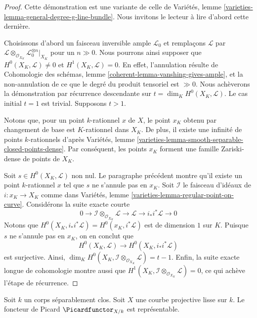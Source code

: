 \begin{proof}
Cette démonstration est une variante de celle de
Variétés, lemme \ref{varieties-lemma-general-degree-g-line-bundle}.
Nous invitons le lecteur à lire d'abord cette dernière.

\medskip\noindent
Choisissons d'abord un faisceau inversible ample $\mathcal{L}_0$ et
remplaçons $\mathcal{L}$ par
$\mathcal{L} \otimes_{\mathcal{O}_{X_K}} \mathcal{L}_0^{\otimes n}|_{X_K}$
pour un $n \gg 0$. Nous pourrons ainsi supposer que
$H^0(X_K, \mathcal{L}) \not = 0$ et $H^1(X_K, \mathcal{L}) = 0$.
En effet, l'annulation résulte de Cohomologie des schémas, lemme
\ref{coherent-lemma-vanshing-gives-ample}, et la non-annulation de ce que
le degré du produit tensoriel est $\gg 0$.
Nous achèverons la démonstration par récurrence descendante sur
$t = \dim_K H^0(X_K, \mathcal{L})$. Le cas initial $t = 1$ est trivial.
Supposons $t > 1$.

\medskip\noindent
Notons que, pour un point $k$-rationnel $x$ de $X$, le point $x_K$
obtenu par changement de base est $K$-rationnel dans $X_K$. De plus, il existe une infinité de
points $k$-rationnels d'après Variétés, lemme
\ref{varieties-lemma-smooth-separable-closed-points-dense}. Par conséquent,
les points $x_K$ forment une famille Zariski-dense de points de $X_K$.

\medskip\noindent
Soit $s \in H^0(X_K, \mathcal{L})$ non nul. Le paragraphe précédent
montre qu'il existe un point $k$-rationnel
$x$ tel que $s$ ne s'annule pas en $x_K$. Soit $\mathcal{I}$
le faisceau d'idéaux de $i : x_K \to X_K$ comme dans
Variétés, lemme \ref{varieties-lemma-regular-point-on-curve}. Considérons la
suite exacte courte
$$
0 \to \mathcal{I} \otimes_{\mathcal{O}_{X_K}} \mathcal{L} \to
\mathcal{L} \to i_*i^*\mathcal{L} \to 0
$$
Notons que $H^0(X_K, i_*i^*\mathcal{L}) = H^0(x_K, i^*\mathcal{L})$
est de dimension $1$ sur $K$. Puisque $s$ ne s'annule pas en $x_K$, on en conclut que
$$
H^0(X_K, \mathcal{L}) \longrightarrow H^0(X_K, i_*i^*\mathcal{L})
$$
est surjective. Ainsi,
$\dim_K H^0(X_K, \mathcal{I} \otimes_{\mathcal{O}_{X_K}} \mathcal{L}) = t - 1$.
Enfin, la suite exacte longue de cohomologie montre aussi que
$H^1(X_K, \mathcal{I} \otimes_{\mathcal{O}_{X_K}} \mathcal{L}) = 0$,
ce qui achève l'étape de récurrence.
\end{proof}

\begin{proposition}
\label{proposition-pic-curve}
Soit $k$ un corps séparablement clos. Soit $X$ une courbe projective lisse
sur $k$. Le foncteur de Picard $\Picardfunctor_{X/k}$ est représentable.
\end{proposition}

